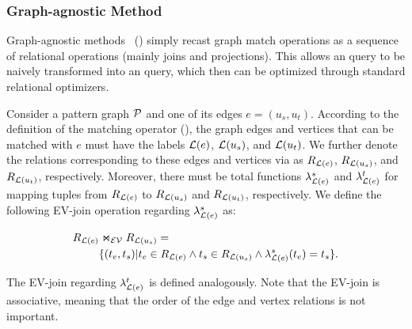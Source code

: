 
\subsubsection{Graph-agnostic Method}
\label{sec:intuitive-method}
Graph-agnostic methods~\cite{apache-age,DuckPGQ,DuckPGQ-VLDB} () simply recast graph match operations
as a sequence of relational operations (mainly joins and projections). This allows an \spjm query to be naively transformed into an \spj query, which then can be optimized through standard relational optimizers.

Consider a pattern graph $\mathcal{P}$ and one of its edges $e = (u_s, u_t)$. According to the definition of the matching operator (), the graph edges and vertices that can be matched with $e$ must have the labels $\mathcal{L}(e)$, $\mathcal{L}(u_s)$, and $\mathcal{L}(u_t)$. We further denote the relations corresponding to these edges and vertices via \rgmapping as $R_{\mathcal{L}(e)}$, $R_{\mathcal{L}(u_s)}$, and $R_{\mathcal{L}(u_t)}$, respectively. Moreover, there must be total functions $\lambda_{\mathcal{L}(e)}^s$ and $\lambda_{\mathcal{L}(e)}^t$ for mapping tuples from $R_{\mathcal{L}(e)}$ to $R_{\mathcal{L}(u_s)}$ and $R_{\mathcal{L}(u_t)}$, respectively. We define the following EV-join operation regarding $\lambda_{\mathcal{L}(e)}^s$ as:

\begin{equation} \label{eq:ev-join}
\begin{split}
R_{\mathcal{L}(e)} & \Join_\mathcal{EV} R_{\mathcal{L}(u_s)} = \\
& \{(t_e, t_s) | t_e \in R_{\mathcal{L}(e)} \land t_s \in R_{\mathcal{L}(u_s)} \land \lambda_{\mathcal{L}(e)}^s(t_e) = t_s\}.
\end{split}
\end{equation}

The EV-join regarding $\lambda_{\mathcal{L}(e)}^t$ is defined analogously. Note that the EV-join is associative, meaning that the order of the edge and vertex relations is not important.


